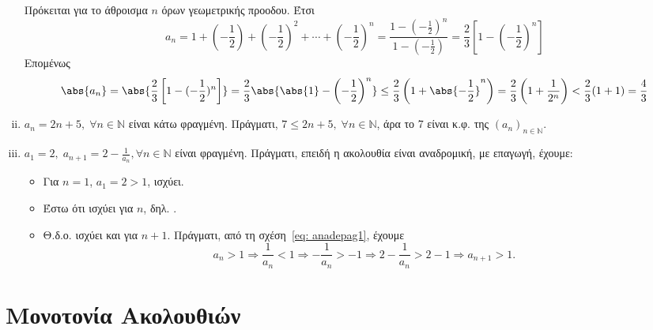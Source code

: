 \documentclass[main.tex]{subfiles}
\begin{document}
\begin{examples}
\begin{enumerate}[i)]
            Πρόκειται για το άθροισμα $ n $ όρων γεωμετρικής προοδου. Έτσι
            \[ a_{n} = 1 + \left(- \frac{1}{2}\right) + \left(- \frac{1}{2} 
                \right)^{2} + \cdots + \left(- \frac{1}{2} \right)^{n} = 
                \frac{1 - (- \frac{1}{2} )^{n}}{1 - (- \frac{1}{2})} = 
            \frac{2}{3} \left[1 - \left(- \frac{1}{2} \right)^{n}\right] \]
            Επομένως
            \[
                \abs{a_{n}} = \abs{\frac{2}{3} \left[1-(- \frac{1}{2} )^{n}
                        \right]} = \frac{2}{3} \abs{\abs{1} - \left(- 
                \frac{1}{2}\right)^{n}} \leq 
                \frac{2}{3} \left(1 + \abs{-\frac{1}{2} }^{n} \right) = 
                \frac{2}{3} \left(1+ \frac{1}{2^{n}}\right) < \frac{2}{3}
                (1+1) = \frac{4}{3} 
            \] 

        \item $ a_{n}= 2n+5, \; \forall n \in \mathbb{N} $ είναι κάτω 
            φραγμένη.
            Πράγματι, $ 7 \leq 2n+5, \; \forall n \in \mathbb{N} $, άρα το 
            7 είναι κ.φ. της $ (a_{n} )_{n \in \mathbb{N}} $.

        \item $ a_{1}=2, \; a_{n+1}=2 - \frac{1}{a_{n}}, \forall n \in 
            \mathbb{N}$
            είναι φραγμένη. Πράγματι, επειδή η ακολουθία είναι αναδρομική, 
            με επαγωγή, έχουμε:
            \begin{itemize}
                \item Για $ n=1 $, $ a_{1}=2>1 $, ισχύει. 
                \item Έστω ότι ισχύει για $n$, δηλ. .
                \item Θ.δ.ο. ισχύει και για $ n+1 $. Πράγματι, από τη 
                    σχέση~\eqref{eq: anadepag1}, έχουμε
                    \[
                        a_{n}>1 \Rightarrow \frac{1}{a_{n}} 
                        < 1 \Rightarrow - \frac{1}{a_{n}} > 
                        -1 \Rightarrow 2 - \frac{1}{a_{n}} 
                        > 2-1 \Rightarrow a_{n+1} > 1.
                    \] 
            \end{itemize}
    \end{enumerate}
\end{examples}

\section{Μονοτονία Ακολουθιών}
\end{document}
